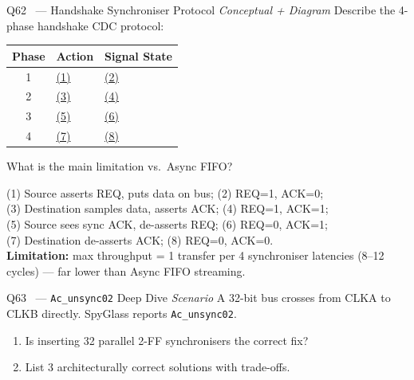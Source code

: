 \documentclass[12pt,a4paper]{article}
\newcommand{\advanced}{%
  \fbox{\textcolor{advred}{\bfseries\sffamily\small ADVANCED}}}
\begin{document}
\begin{questionbox}{Q62 \advanced\ --- Handshake Synchroniser Protocol \hfill\textit{Conceptual + Diagram}}
Describe the 4-phase handshake CDC protocol:

\begin{center}
\begin{tabular}{|c|l|l|}
\hline
\rowcolor{dkblue!15}
\textbf{Phase} & \textbf{Action} & \textbf{Signal State}\\
\hline
1 & \underline{(1)} & \underline{(2)}\\
\hline
2 & \underline{(3)} & \underline{(4)}\\
\hline
3 & \underline{(5)} & \underline{(6)}\\
\hline
4 & \underline{(7)} & \underline{(8)}\\
\hline
\end{tabular}
\end{center}

What is the main limitation vs.\ Async FIFO?
\end{questionbox}

\begin{answerbox}
(1) Source asserts REQ, puts data on bus; (2) REQ=1, ACK=0;\\
(3) Destination samples data, asserts ACK; (4) REQ=1, ACK=1;\\
(5) Source sees sync ACK, de-asserts REQ; (6) REQ=0, ACK=1;\\
(7) Destination de-asserts ACK; (8) REQ=0, ACK=0.\\
\textbf{Limitation:} max throughput = 1 transfer per 4 synchroniser latencies (8--12 cycles) --- far lower than Async FIFO streaming.
\end{answerbox}

\begin{questionbox}{Q63 \advanced\ --- \texttt{Ac\_unsync02} Deep Dive \hfill\textit{Scenario}}
A 32-bit bus crosses from CLKA to CLKB directly. SpyGlass reports \texttt{Ac\_unsync02}.
\begin{enumerate}[label=\textbf{\alph*)}]
  \item Is inserting 32 parallel 2-FF synchronisers the correct fix?
  \item List 3 architecturally correct solutions with trade-offs.
\end{enumerate}
\end{questionbox}
\end{document}
